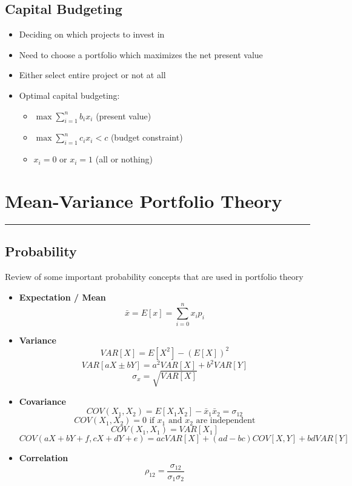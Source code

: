 \documentclass[11pt]{article}
\begin{document}
\subsection{Capital Budgeting}
\begin{itemize}
\item Deciding on which projects to invest in 
\item Need to choose a portfolio which maximizes the net present value
\item Either select entire project or not at all
\item Optimal capital budgeting: 
\begin{itemize}
\item $ \max \sum_{i=1}^n b_ix_i $ (present value)
\item $ \max \sum_{i=1}^n c_ix_i < c$ (budget constraint)
\item $x_i = 0$ or $x_i = 1$ (all or nothing)
\end{itemize}
\end{itemize}
\pagebreak

\section{Mean-Variance Portfolio Theory}
\hrule \vspace{15pt}

\subsection{Probability}
Review of some important probability concepts that are used in portfolio theory
\begin{itemize}
\item \textbf{Expectation / Mean}
$$ \bar{x} = E[x] = \sum_{i=0}^n x_ip_i $$
\item \textbf{Variance}
$$ VAR[X] = E[X^2] - (E[X])^2$$ 
$$ VAR[aX \pm bY] = a^2VAR[X] + b^2VAR[Y]$$
$$ \sigma_x = \sqrt{VAR[X]}$$
\item \textbf{Covariance}
$$ COV(X_1, X_2) = E[X_1X_2] - \bar{x}_1\bar{x}_2 = \sigma_{12}$$
$$ COV(X_1, X_2) = 0  \text{ if } x_1 \text{ and } x_2 \text { are independent}$$
$$ COV(X_1, X_1) = VAR[X_1]$$
$$ COV(aX + bY + f, cX+dY+e) = acVAR[X] +(ad-bc) COV[X,Y] + bdVAR[Y]$$
\item \textbf{Correlation}
$$ \rho_{12} = \frac{\sigma_{12}}{\sigma_1 \sigma_2}$$
\end{itemize}
\end{document}
